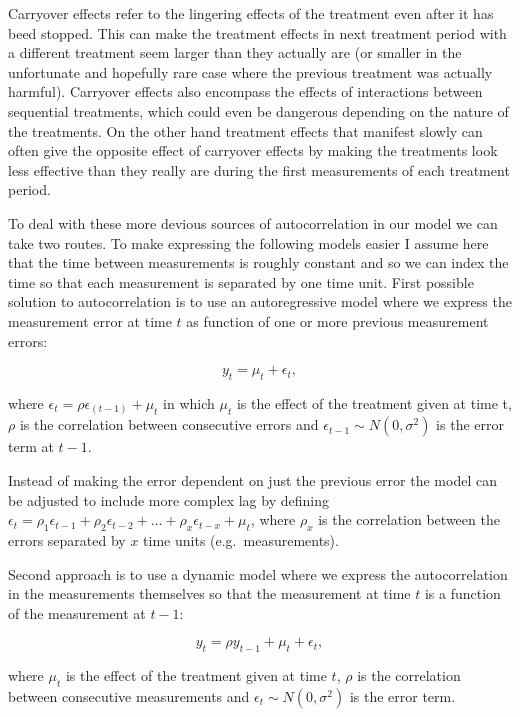 \documentclass[12pt,a4paper,leqno]{report}
\theoremstyle{plain}
\theoremstyle{definition}
\theoremstyle{remark}
\begin{document}
Carryover effects refer to the lingering effects of the treatment even after it has
beed stopped. This can make the treatment effects in next treatment period with
a different treatment seem larger than they actually are (or smaller in the unfortunate
and hopefully rare case where the previous treatment was actually harmful). Carryover effects also
encompass the effects of interactions between sequential treatments, which could
even be dangerous depending on the nature of the treatments. On the other hand treatment
effects that manifest slowly can often give the opposite effect of carryover effects by making
the treatments look less effective than they really are during the first measurements of
each treatment period.\cite{stat}

To deal with these more devious sources of autocorrelation in our model we can take two routes.
To make expressing the following models easier I assume here that the time between measurements
is roughly constant and so we can index the time so that each measurement is separated by one
time unit. First possible solution to autocorrelation is to use an autoregressive model where
we express the measurement error at time \(t\) as function of one or more previous measurement errors:

\begin{def}\label{}
\begin{equation}\label{}
y_t = \mu_t + \epsilon_t,
\end{equation}
\end{def}where \(\epsilon_t = \rho\epsilon_{(t - 1)} + \mu_t\) in which
\(\mu_t\) is the effect of the treatment given at time t,
\(\rho \) is the correlation between consecutive errors and
\(\epsilon_{t-1} \sim N(0,\sigma^2) \) is the error term at \(t-1\).

Instead of making the error dependent on just the previous error the model can be adjusted
to include more complex lag by defining \(\epsilon_t = \rho_1\epsilon_{t-1} +
\rho_2\epsilon_{t-2} + \ldots + \rho_x\epsilon_{t-x} + \mu_t\), where \(\rho_x\) is the correlation
between the errors separated by \(x\) time units (e.g.\ measurements).

Second approach is to use a dynamic model where we express the autocorrelation in the measurements
themselves so that the measurement at time \(t\) is a function of the measurement at \(t-1\):

\begin{def}\label{}
\begin{equation}\label{}
y_t = \rho y_{t-1} + \mu_t + \epsilon_t,
\end{equation}
\end{def}where \(\mu_t\) is the effect of the treatment given at time \(t\), \(\rho \) is the correlation
between consecutive measurements and \(\epsilon_t \sim N(0,\sigma^2)\) is the error term.
\end{document}
